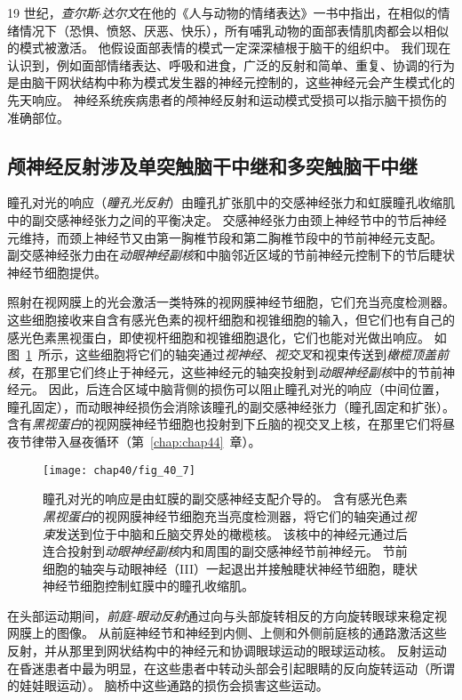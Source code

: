 19 世纪，\textit{查尔斯$\cdot$达尔文}在他的《人与动物的情绪表达》一书中指出，在相似的情绪情况下（恐惧、愤怒、厌恶、快乐），所有哺乳动物的面部表情肌肉都会以相似的模式被激活。
他假设面部表情的模式一定深深植根于脑干的组织中。
我们现在认识到，例如面部情绪表达、呼吸和进食，广泛的反射和简单、重复、协调的行为是由脑干网状结构中称为模式发生器的神经元控制的，这些神经元会产生模式化的先天响应。
神经系统疾病患者的颅神经反射和运动模式受损可以指示脑干损伤的准确部位。



\subsection{颅神经反射涉及单突触脑干中继和多突触脑干中继}

瞳孔对光的响应（\textit{瞳孔光反射}）由瞳孔扩张肌中的交感神经张力和虹膜瞳孔收缩肌中的副交感神经张力之间的平衡决定。
交感神经张力由颈上神经节中的节后神经元维持，而颈上神经节又由第一胸椎节段和第二胸椎节段中的节前神经元支配。
副交感神经张力由在\textit{动眼神经副核}和中脑邻近区域的节前神经元控制下的节后睫状神经节细胞提供。


照射在视网膜上的光会激活一类特殊的视网膜神经节细胞，它们充当亮度检测器。
这些细胞接收来自含有感光色素的视杆细胞和视锥细胞的输入，但它们也有自己的感光色素黑视蛋白，即使视杆细胞和视锥细胞退化，它们也能对光做出响应。
如图~\ref{fig:40_7}~所示，这些细胞将它们的轴突通过\textit{视神经}、\textit{视交叉}和视束传送到\textit{橄榄顶盖前核}，在那里它们终止于神经元，这些神经元的轴突投射到\textit{动眼神经副核}中的节前神经元。
因此，后连合区域中脑背侧的损伤可以阻止瞳孔对光的响应（中间位置，瞳孔固定），而动眼神经损伤会消除该瞳孔的副交感神经张力（瞳孔固定和扩张）。
含有\textit{黑视蛋白}的视网膜神经节细胞也投射到下丘脑的视交叉上核，在那里它们将昼夜节律带入昼夜循环（第~\ref{chap:chap44}~章）。


\begin{figure}[htbp]
	\centering
	\texttt{[image: chap40/fig\_40\_7]}
	\caption{瞳孔对光的响应是由虹膜的副交感神经支配介导的。
		含有感光色素\textit{黑视蛋白}的视网膜神经节细胞充当亮度检测器，将它们的轴突通过\textit{视束}发送到位于中脑和丘脑交界处的橄榄核。
		该核中的神经元通过后连合投射到\textit{动眼神经副核}内和周围的副交感神经节前神经元。
		节前细胞的轴突与动眼神经（III）一起退出并接触睫状神经节细胞，睫状神经节细胞控制虹膜中的瞳孔收缩肌。}
	\label{fig:40_7}
\end{figure}


在头部运动期间，\textit{前庭-眼动反射}通过向与头部旋转相反的方向旋转眼球来稳定视网膜上的图像。
从前庭神经节和神经到内侧、上侧和外侧前庭核的通路激活这些反射，并从那里到网状结构中的神经元和协调眼球运动的眼球运动核。
反射运动在昏迷患者中最为明显，在这些患者中转动头部会引起眼睛的反向旋转运动（所谓的娃娃眼运动）。
脑桥中这些通路的损伤会损害这些运动。


